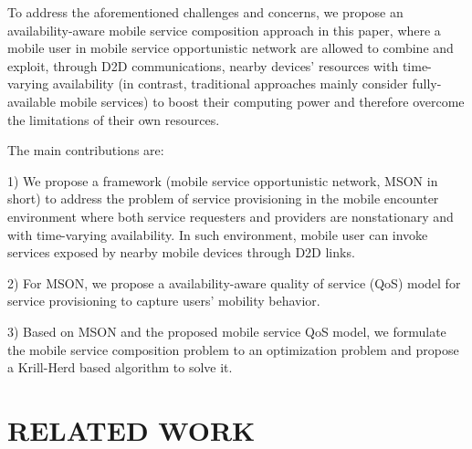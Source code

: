 \documentclass[10pt,journal,compsoc]{IEEEtran}
\begin{document}
To address the aforementioned challenges and concerns, we propose an availability-aware mobile service composition approach in this paper, where a mobile user in mobile service opportunistic network are allowed to combine and exploit, through D2D communications, nearby devices' resources with time-varying availability (in contrast, traditional approaches mainly consider fully-available mobile services) to boost their computing power and therefore overcome the limitations of their own resources. 

The main contributions are:

1) We propose a framework (mobile service opportunistic network, MSON in short) to address the problem of service provisioning in the mobile encounter environment where both service requesters and providers are nonstationary and with time-varying availability. In such environment, mobile user can invoke services exposed by nearby mobile devices through D2D links.

2) For MSON, we propose a availability-aware quality of service (QoS) model for service provisioning to capture users' mobility behavior.

3) Based on MSON and the proposed mobile service QoS model, we formulate the mobile service composition problem to an optimization problem and propose a Krill-Herd based algorithm to solve it. 



\section{RELATED WORK}
\end{document}
